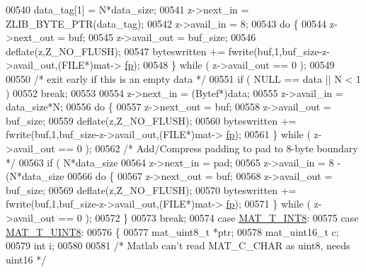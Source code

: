 \begin{DoxyCode}
{{{{00540             data\_tag[1] = N*data\_size;
00541             z->next\_in  = ZLIB\_BYTE\_PTR(data\_tag);
00542             z->avail\_in = 8;
00543             \textcolor{keywordflow}{do} \{
00544                 z->next\_out  = buf;
00545                 z->avail\_out = buf\_size;
00546                 deflate(z,Z\_NO\_FLUSH);
00547                 byteswritten += fwrite(buf,1,buf\_size-z->avail\_out,(FILE*)mat->
      \hyperlink{struct__mat__t_a85f562e407ca9ad4d2a6e14f839432b7}{fp});
00548             \} \textcolor{keywordflow}{while} ( z->avail\_out == 0 );
00549 
00550             \textcolor{comment}{/* exit early if this is an empty data */}
00551             \textcolor{keywordflow}{if} ( NULL == data || N < 1 )
00552                 \textcolor{keywordflow}{break};
00553 
00554             z->next\_in  = (Bytef*)data;
00555             z->avail\_in = data\_size*N;
00556             \textcolor{keywordflow}{do} \{
00557                 z->next\_out  = buf;
00558                 z->avail\_out = buf\_size;
00559                 deflate(z,Z\_NO\_FLUSH);
00560                 byteswritten += fwrite(buf,1,buf\_size-z->avail\_out,(FILE*)mat->
      \hyperlink{struct__mat__t_a85f562e407ca9ad4d2a6e14f839432b7}{fp});
00561             \} \textcolor{keywordflow}{while} ( z->avail\_out == 0 );
00562             \textcolor{comment}{/* Add/Compress padding to pad to 8-byte boundary */}
00563             \textcolor{keywordflow}{if} ( N*data\_size %
00564                 z->next\_in  = pad;
00565                 z->avail\_in = 8 - (N*data\_size %
00566                 \textcolor{keywordflow}{do} \{
00567                     z->next\_out  = buf;
00568                     z->avail\_out = buf\_size;
00569                     deflate(z,Z\_NO\_FLUSH);
00570                     byteswritten += fwrite(buf,1,buf\_size-z->avail\_out,(FILE*)mat->
      \hyperlink{struct__mat__t_a85f562e407ca9ad4d2a6e14f839432b7}{fp});
00571                 \} \textcolor{keywordflow}{while} ( z->avail\_out == 0 );
00572             \}
00573             \textcolor{keywordflow}{break};
00574         \textcolor{keywordflow}{case} \hyperlink{group___m_a_t_ggacf7b3b879282b7ab3a51190e49bf3453a9807f5033ed4f9b548953742d9fd1658}{MAT\_T\_INT8}:
00575         \textcolor{keywordflow}{case} \hyperlink{group___m_a_t_ggacf7b3b879282b7ab3a51190e49bf3453a01c1bd7db68f90552862eb5d311be408}{MAT\_T\_UINT8}:
00576         \{
00577             mat\_uint8\_t *ptr;
00578             mat\_uint16\_t c;
00579             \textcolor{keywordtype}{int} i;
00580 
00581             \textcolor{comment}{/* Matlab can't read MAT\_C\_CHAR as uint8, needs uint16 */}
}}}}
\end{DoxyCode}
